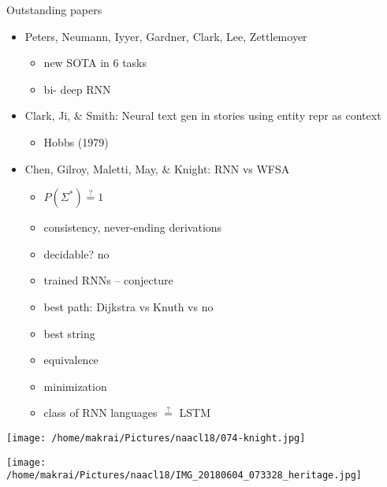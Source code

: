\documentclass{beamer}
\begin{document}
\begin{frame}[allowframebreaks]{Outstanding papers}
  \begin{itemize} 
    \item Peters, Neumann, Iyyer, Gardner, Clark, Lee, Zettlemoyer
      \begin{itemize}
        \item new SOTA in 6 tasks
        \item bi- deep RNN
      \end{itemize}
    \item Clark, Ji, \& Smith: Neural text gen in stories using entity repr as context
      \begin{itemize}
        \item Hobbs (1979)
      \end{itemize}
    \item Chen, Gilroy, Maletti, May, \& Knight: RNN vs WFSA
      \begin{itemize}
        \item $P(\Sigma^*) \stackrel{?}{=} 1$
        \item consistency, never-ending derivations
        \item decidable? no
        \item trained RNNs -- conjecture
        \item best path: Dijkstra vs Knuth vs no
        \item best string
        \item equivalence
        \item minimization
        \item class of RNN languages $\stackrel ?=$ LSTM
      \end{itemize}
  \end{itemize}
  \texttt{[image: /home/makrai/Pictures/naacl18/074-knight.jpg]}
\end{frame}

\begin{frame}
  \texttt{[image: /home/makrai/Pictures/naacl18/IMG\_20180604\_073328\_heritage.jpg]}
\end{frame}
\end{document}
